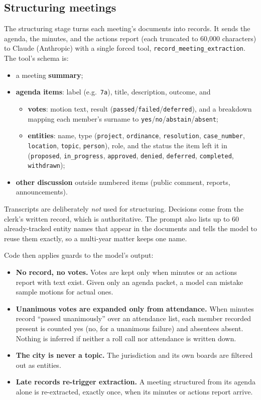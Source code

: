 \documentclass[11pt]{article}
\newcommand{\code}[1]{\texttt{#1}}
\begin{document}
\subsection{Structuring meetings}
\label{sec:structuring}

The structuring stage turns each meeting's documents into records. It sends the agenda,
the minutes, and the actions report (each truncated to 60{,}000 characters) to Claude
(Anthropic) with a single forced tool, \code{record\_meeting\_extraction}. The tool's
schema is:

\begin{itemize}
  \item a meeting \textbf{summary};
  \item \textbf{agenda items}: label (e.g.\ \code{7a}), title, description, outcome, and
  \begin{itemize}
    \item \textbf{votes}: motion text, result (\code{passed}/\code{failed}/\code{deferred}),
          and a breakdown mapping each member's surname to
          \code{yes}/\code{no}/\code{abstain}/\code{absent};
    \item \textbf{entities}: name, type (\code{project}, \code{ordinance},
          \code{resolution}, \code{case\_number}, \code{location}, \code{topic},
          \code{person}), role, and the status the item left it in (\code{proposed},
          \code{in\_progress}, \code{approved}, \code{denied}, \code{deferred},
          \code{completed}, \code{withdrawn});
  \end{itemize}
  \item \textbf{other discussion} outside numbered items (public comment, reports,
        announcements).
\end{itemize}

Transcripts are deliberately \emph{not} used for structuring. Decisions come from the
clerk's written record, which is authoritative. The prompt also lists up to 60
already-tracked entity names that appear in the documents and tells the model to reuse
them exactly, so a multi-year matter keeps one name.

Code then applies guards to the model's output:
\begin{itemize}
  \item \textbf{No record, no votes.} Votes are kept only when minutes or an actions report
        with text exist. Given only an agenda packet, a model can mistake sample motions for
        actual ones.
  \item \textbf{Unanimous votes are expanded only from attendance.} When minutes record
        ``passed unanimously'' over an attendance list, each member recorded present is
        counted yes (no, for a unanimous failure) and absentees absent. Nothing is
        inferred if neither a roll call nor attendance is written down.
  \item \textbf{The city is never a topic.} The jurisdiction and its own boards are filtered
        out as entities.
  \item \textbf{Late records re-trigger extraction.} A meeting structured from its agenda
        alone is re-extracted, exactly once, when its minutes or actions report arrive.
\end{itemize}
\end{document}
